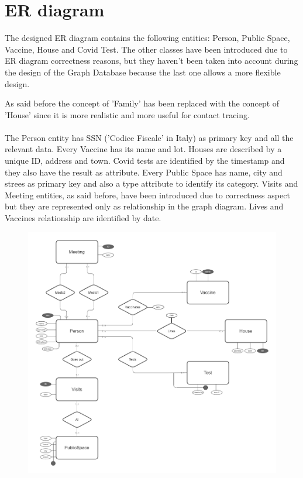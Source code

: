 \documentclass{article}
\begin{document}
\section{ER diagram}
The designed ER diagram contains the following entities: Person, Public Space, Vaccine, House and Covid Test. The other classes have been introduced due to ER diagram correctness reasons, but they haven't been taken into account during the design of the Graph Database because the last one allows a more flexible design. 

As said before the concept of 'Family' has been replaced with the concept of 'House' since it is more realistic and more useful for contact tracing.
\\
\\The Person entity has SSN ('Codice Fiscale' in Italy) as primary key and all the relevant data. Every Vaccine has its name and lot. Houses are described by a unique ID, address and town. 
Covid tests are identified by the timestamp and they also have the result as attribute. Every Public Space has name, city and strees as primary key and also a type attribute to identify its category.
Visits and Meeting entities, as said before, have been introduced due to correctness aspect but they are represented only as relationship in the graph diagram. Lives and Vaccines relationship are identified by date. 

\begin{figure}[h]
\centering 
\includegraphics[scale=0.3]{er.png} 
\end{figure}
\newpage
\end{document}
